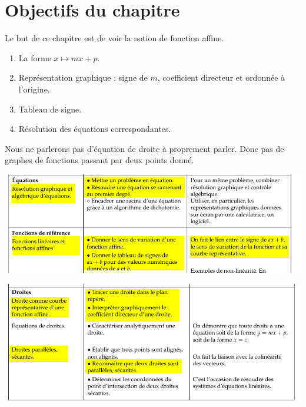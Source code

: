 
\section{Objectifs du chapitre}

Le but de ce chapitre est de voir la notion de fonction affine.
\begin{enumerate}
    \item
        La forme \( x\mapsto mx+p\).
    \item
        Représentation graphique : signe de \( m\), coefficient directeur et ordonnée à l'origine.
    \item
        Tableau de signe.
    \item
        Résolution des équations correspondantes.
\end{enumerate}
Nous ne parlerons pas d'équation de droite à proprement parler. Donc pas de graphes de fonctions passant par deux points donné.

\includegraphics[width=\linewidth]{BO_fonctions_affines1.png}

\vspace{1cm}

\includegraphics[width=\linewidth]{BO_fonctions_affines2.png}

